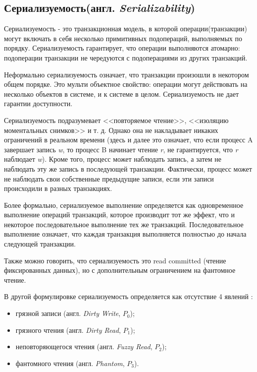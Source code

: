 \documentclass[12pt,  openany]{book}
\begin{document}
\subsection{Сериализуемость(англ.  \textit{Serializability})}
Сериализуемость - это транзакционная модель, в которой операции(транзакции) могут включать в себя несколько примитивных подопераций, выполняемых по порядку. Сериализуемость гарантирует, что операции выполняются атомарно: подоперации транзакции не чередуются с подоперациями из других транзакций.
\par
Неформально сериализуемость означает, что транзакции произошли в некотором общем порядке.
Это мульти объектное свойство: операции могут действовать на несколько объектов в системе, и к системе в целом. Сериализуемость не дает гарантии доступности.
\par
Сериализуемость подразумевает <<повторяемое чтение>>, <<изоляцию моментальных снимков>> и т. д. Однако она не накладывает никаких ограничений в реальном времени (здесь и далее это означает, что если процесс A завершает запись \textit{w}, то процесс B начинает чтение \textit{r}, не гарантируется, что \textit{r} наблюдает \textit{w}).
Кроме того, процесс может наблюдать запись, а затем не наблюдать эту же запись в последующей транзакции. Фактически, процесс может не наблюдать свои собственные предыдущие записи, если эти записи происходили в разных транзакциях.
\par
Более формально, сериализуемое выполнение определяется как одновременное выполнение операций транзакций, которое производит тот же эффект, что и некоторое последовательное выполнение тех же транзакций. Последовательное выполнение означает, что каждая транзакция выполняется полностью до начала следующей транзакции.
\par
Также можно говорить, что сериализуемость это read committed (чтение фиксированных данных), но с дополнительным ограничением на фантомное чтение.
\par
В другой формулировке сериализуемость определяется как отсутствие 4 явлений \cite{IsolationLevelDefinitions}:
\begin{itemize}
  \item грязной записи (англ.  \textit{Dirty Write},  $P_0$);
  \item грязного чтения (англ. \textit{Dirty Read}, $P_1$);
  \item неповторяющегося чтения (англ. \textit{Fuzzy Read}, $P_2$);
  \item фантомного чтения (англ. \textit{Phantom}, $P_3$).
\end{itemize}
\end{document}
